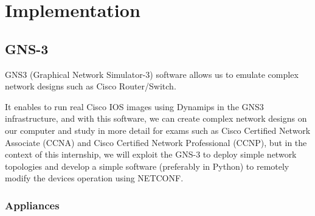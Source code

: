 \chapter{Implementation}

\section{GNS-3}

GNS3 (Graphical Network Simulator-3) software allows us to emulate complex network designs such as Cisco Router/Switch.

It enables to run real Cisco IOS images using Dynamips in the GNS3 infrastructure, and with this software, we can create complex network designs on our computer and study in more detail for exams such as Cisco Certified Network Associate (CCNA) and Cisco Certified Network Professional (CCNP), but in the context of this internship, we will exploit the GNS-3 to deploy simple network topologies and develop a simple software (preferably in Python) to remotely modify the devices operation using NETCONF.


\subsection{Appliances}

